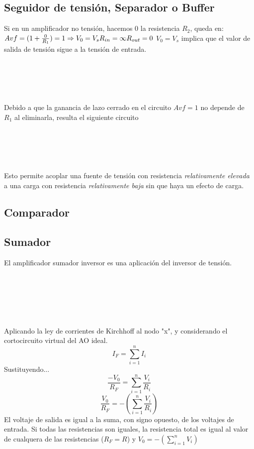 \documentclass[12pt,spanish,lettersize]{article}
\begin{document}
\subsection{Seguidor de tensi\'on, Separador o Buffer}
Si en un amplificador no tensi\'on, hacemos 0 la resistencia $R_{2}$, queda en:\\
\begin{math}
\\
Avf = (1+\frac{0}{R_{1}})=1\Rightarrow V_{0}=V_{s}\\
R_{in}=\infty\\
R_{out}=0\\
\end{math}
$V_{0} = V_{s}$ implica que el valor de salida de tensi\'on sigue a la tensi\'on de entrada.\\
\\ \\ \\ \\ \\
Debido a que la ganancia de lazo cerrado en el circuito $Avf = 1$ no depende de $R_{1}$ al eliminarla, resulta el siguiente circuito\\
\\ \\ \\ \\ \\
Esto permite acoplar una fuente de tensi\'on con resistencia \emph{relativamente elevada} a una carga con resistencia \emph{relativamente baja} sin que haya un efecto de carga.
\subsection{Comparador}

\subsection{Sumador}
El amplificador sumador inversor es una aplicaci\'on del inversor de tensi\'on.\\
\\ \\ \\ \\ \\ \\
Aplicando la ley de corrientes de Kirchhoff al nodo "x", y considerando el cortocircuito virtual del AO ideal.
\begin{equation}
I_{F} = \sum\limits_{i=1}^{n}I_{i}
\end{equation}
Sustituyendo...
\begin{equation}
\frac{-V_{0}}{R_{F}}=\sum\limits_{i=1}^{n}\frac{V_{i}}{R_{i}}
\end{equation}
\begin{equation}
\frac{V_{0}}{R_{F}}=-(\sum\limits_{i=1}^{n}\frac{V_{i}}{R_{i}})
\end{equation}
El voltaje de salida es igual a la suma, con signo opuesto, de los voltajes de entrada. Si todas las resistencias son iguales, la resistencia total es igual al valor de cualquera de las resistencias ($R_{F}=R$) y $V_{0}=-(\sum\limits_{i=1}^{n}V_{i})$
\end{document}
